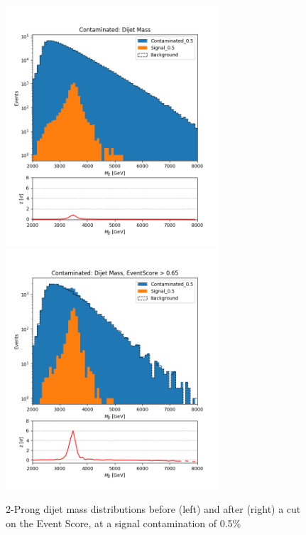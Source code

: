 \documentclass[12pt, a4paper]{article}
\begin{document}
\begin{figure}[H]
	\begin{center}
		\includegraphics[width=225pt]{imgs/2Prong_Contaminated_0p5_JJ_Mass_Multi.png}
		\includegraphics[width=225pt]{imgs/2Prong_Contaminated_0p5_JJ_Mass_EventScore0p65_Multi.png}
	\end{center}
	\caption{2-Prong dijet mass distributions before (left) and after (right) a cut on the Event Score, at a signal contamination of 0.5\%}
	\label{fig:2p_dijet}
\end{figure}
\end{document}
